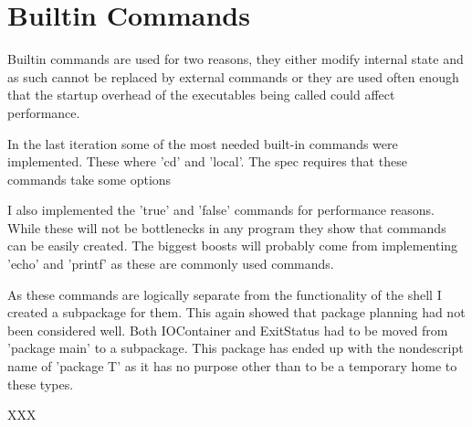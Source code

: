 \section{Builtin Commands}
\label{sec:builtins}
Builtin commands are used for two reasons, they either modify internal state and as such cannot be replaced by external commands or they are used often enough that the startup overhead of the executables being called could affect performance.

In the last iteration some of the most needed built-in commands were implemented.
These where 'cd' and 'local'.
The spec requires that these commands take some options 

I also implemented the 'true' and 'false' commands for performance reasons.
While these will not be bottlenecks in any program they show that commands can be easily created.
The biggest boosts will probably come from implementing 'echo' and 'printf' as these are commonly used commands.

As these commands are logically separate from the functionality of the shell I created a subpackage for them.
This again showed that package planning had not been considered well.
Both IOContainer and ExitStatus had to be moved from 'package main' to a subpackage.
This package has ended up with the nondescript name of 'package T' as it has no purpose other than to be a temporary home to these types.

XXX